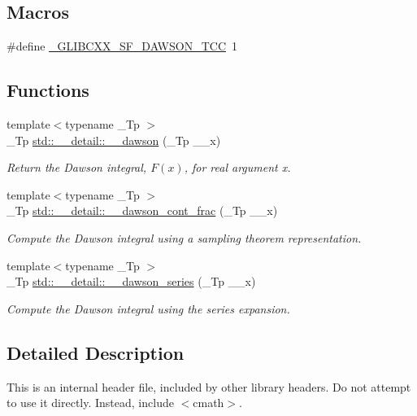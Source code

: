\subsection*{Macros}
\begin{DoxyCompactItemize}
\item 
\#define \hyperlink{sf__dawson_8tcc_a72d0ce5cd51240da4fb2546e640923de}{\+\_\+\+G\+L\+I\+B\+C\+X\+X\+\_\+\+S\+F\+\_\+\+D\+A\+W\+S\+O\+N\+\_\+\+T\+CC}~1
\end{DoxyCompactItemize}
\subsection*{Functions}
\begin{DoxyCompactItemize}
\item 
{\footnotesize template$<$typename \+\_\+\+Tp $>$ }\\\+\_\+\+Tp \hyperlink{namespacestd_1_1____detail_a6384fb4c5af31b41a38c120869a548c7}{std\+::\+\_\+\+\_\+detail\+::\+\_\+\+\_\+dawson} (\+\_\+\+Tp \+\_\+\+\_\+x)
\begin{DoxyCompactList}\small\item\em Return the Dawson integral, $ F(x) $, for real argument {\ttfamily x}. \end{DoxyCompactList}\item 
{\footnotesize template$<$typename \+\_\+\+Tp $>$ }\\\+\_\+\+Tp \hyperlink{namespacestd_1_1____detail_a3ad3b7b4dcebdf69778dbf7a5ba2427c}{std\+::\+\_\+\+\_\+detail\+::\+\_\+\+\_\+dawson\+\_\+cont\+\_\+frac} (\+\_\+\+Tp \+\_\+\+\_\+x)
\begin{DoxyCompactList}\small\item\em Compute the Dawson integral using a sampling theorem representation. \end{DoxyCompactList}\item 
{\footnotesize template$<$typename \+\_\+\+Tp $>$ }\\\+\_\+\+Tp \hyperlink{namespacestd_1_1____detail_a033d91cc1c67280385ff3d1d809a21d1}{std\+::\+\_\+\+\_\+detail\+::\+\_\+\+\_\+dawson\+\_\+series} (\+\_\+\+Tp \+\_\+\+\_\+x)
\begin{DoxyCompactList}\small\item\em Compute the Dawson integral using the series expansion. \end{DoxyCompactList}\end{DoxyCompactItemize}


\subsection{Detailed Description}
This is an internal header file, included by other library headers. Do not attempt to use it directly. Instead, include $<$cmath$>$. 

